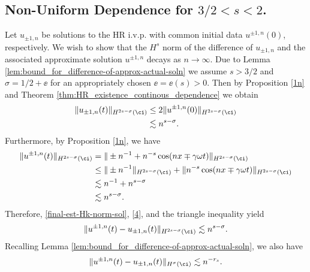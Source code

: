 \subsection{Non-Uniform Dependence for $3/2<s<2$.}
%
%
%
Let $u_{\pm 1, n}$ be solutions to the HR i.v.p. with common initial data $u^{\pm 1,
n}(0)$, respectively.
We wish to show that the $H^s$ norm of the difference of $u_{\pm 1,
n}$ and the associated approximate solution $u^{\pm 1, n}$
decays as $n \to \infty$. Due to Lemma
\ref{lem:bound_for_difference-of-approx-actual-soln} we assume
$s > 3/2 $ and $\sigma = 1/2 + \ee$ for an appropriately
chosen $\ee= \ee(s) > 0$. Then by Proposition \ref{1n} and
Theorem \ref{thm:HR_existence_continous_dependence}
we obtain
\begin{equation}
	\begin{split}
		\|u_{\pm 1, n} (t) \|_{H^{2s - \sigma}(\ci)}
		& \le 2 \|u^{\pm 1, n}(0) \|_{H^{2s - \sigma}(\ci)}
		\\
		& \lesssim n^{s- \sigma}.
			\label{final-est-Hk-norm-sol}
	\end{split}
\end{equation}
Furthermore, by Proposition \ref{1n}, we have
\begin{equation}
	\begin{split}
		\|u^{\pm 1, n} (t) \|_{H^{2s - \sigma} (\ci)}
		& = \|\pm n^{-1} + n^{-s} \cos(nx \mp \gamma \omega t) \|_{H^{2s - \sigma}(\ci)}
		\\
		& \le \| \pm n^{-1} \|_{H^{2s - \sigma}(\ci)} +
		\|n^{-s} \cos(nx \mp \gamma \omega
		t) \|_{H^{2s - \sigma}(\ci)}
		\\
		& \lesssim n^{-1} + n^{s-\sigma}
		\\
		& \lesssim n^{s-\sigma}.
		\label{4}
	\end{split}
\end{equation}
		Therefore, \eqref{final-est-Hk-norm-sol}, \eqref{4}, and the triangle
		inequality yield
		\begin{equation}
			\begin{split}
				\|u^{\pm 1, n} (t) - u_{\pm 1, n}(t)\|_{H^{2s - \sigma}(\ci)}
				\lesssim n^{s-\sigma}.
				\label{5h}
			\end{split}
		\end{equation}
		Recalling
		Lemma \ref{lem:bound_for_difference-of-approx-actual-soln}, we also
		have
		\begin{equation}
			\begin{split}
				\|u^{\pm 1, n}(t) - u_{\pm 1, n} (t) \|_{H^\sigma (\ci)} 
				\lesssim n^{-r_s}
				\label{6h}.
			\end{split}
		\end{equation}
